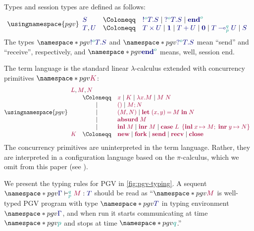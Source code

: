\documentclass[sigplan,screen]{acmart}
\begin{document}
Types and session types are defined as follows:
\[
  \usingnamespace{pgv}
  \begin{array}{lcl}
    \ty{S}
    & \Coloneqq & \ty{\tysend[\cs{o}]{T}{S}}
      \mid        \ty{\tyrecv[\cs{o}]{T}{S}}
      \mid        \ty{\tyend[\cs{o}]}
    \\
    \ty{T}, \ty{U}
    & \Coloneqq & \ty{\typrod{T}{U}}
      \mid        \ty{\tyunit}
      \mid        \ty{\tysum{T}{U}}
      \mid        \ty{\tyvoid}
      \mid        \ty{\tylolli{\cs{p}}{\cs{q}}{T}{U}}
      \mid        \ty{S}
  \end{array}
\]
The types $\pgv{\ty{\tysend[\cs{o}]{T}{S}}}$ and $\pgv{\ty{\tyrecv[\cs{o}]{T}{S}}}$ mean ``send'' and ``receive'', respectively, and $\pgv{\ty{\tyend[\cs{o}]}}$ means, well, session end.

The term language is the standard linear $\lambda$-calculus extended with concurrency primitives $\pgv{\tm{K}}$:
\[
  \usingnamespace{pgv}
  \begin{array}{lcl}
    \multicolumn{3}{l}{\tm{L}, \tm{M}, \tm{N}}
    \\
    & \Coloneqq & \tm{x}
      \mid        \tm{K}
      \mid        \tm{\lambda x.M}
      \mid        \tm{M\;N} \\
    & \mid      & \tm{\unit}
      \mid        \tm{\andthen{M}{N}} \\
    & \mid      & \tm{\pair{M}{N}}
      \mid        \tm{\letpair{x}{y}{M}{N}} \\
    & \mid      & \tm{\absurd{M}} \\
    & \mid      & \tm{\inl{M}}
      \mid        \tm{\inr{M}}
      \mid        \tm{\casesum{L}{x}{M}{y}{N}}
    \\
    \tm{K}
    & \Coloneqq & \tm{\new}
      \mid        \tm{\fork}
      \mid        \tm{\send}
      \mid        \tm{\recv}
      \mid        \tm{\close}
  \end{array}
\]
The concurrency primitives are uninterpreted in the term language. Rather, they are interpreted in a configuration language based on the $\pi$-calculus, which we omit from this paper (see \citet{kokkedardha21}).



We present the typing rules for PGV in \cref{fig:pgv-typing}. A sequent $\pgv{\seq{p}{q}{\ty{\Gamma}}{M}{T}}$ should be read as ``$\pgv{\tm{M}}$ is well-typed PGV program with type $\pgv{\ty{T}}$ in typing environment $\pgv{\ty{\Gamma}}$, and when run it starts communicating at time $\pgv{\cs{p}}$ and stops at time $\pgv{\cs{q}}$.''
\end{document}
